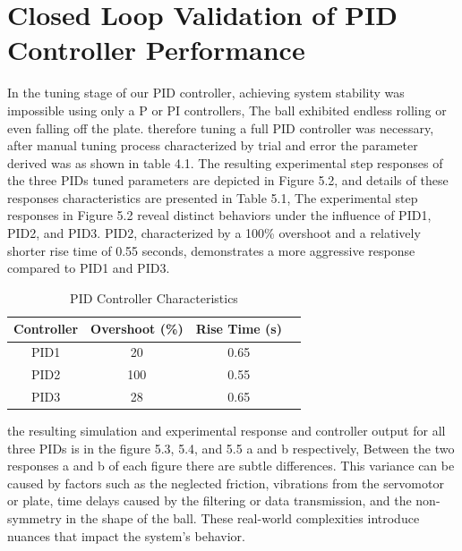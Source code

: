 \section{Closed Loop Validation of PID Controller Performance}
In the tuning stage of our PID controller, achieving system stability was impossible  using only a P or PI controllers, The ball exhibited endless rolling or even falling off the plate.
therefore tuning a full PID controller was necessary, after  manual tuning process characterized by trial and error the parameter derived was  as shown in table 4.1. The resulting  experimental step responses of the three PIDs tuned parameters are depicted in Figure 5.2, and details of these responses characteristics are presented in Table 5.1, The experimental step responses in Figure 5.2 reveal distinct behaviors under the influence of PID1, PID2, and PID3. PID2, characterized by a 100\% overshoot and a relatively shorter rise time of 0.55 seconds, demonstrates a more aggressive response compared to PID1 and PID3.
\begin{table}[ht]
    \centering
    \caption{PID Controller Characteristics}
    \label{tab:pid-parameters}
    \begin{tabular}{|c|c|c|c|}
        \hline
        \textbf{Controller} & \textbf{Overshoot (\%)} & \textbf{Rise Time (s)} \\
        \hline
        PID1 & 20 & 0.65 \\
        PID2 & 100 & 0.55 \\
        PID3 & 28 & 0.65 \\
        \hline
    \end{tabular}
\end{table} 

the resulting simulation and experimental response and controller output for all three PIDs is in the figure 5.3, 5.4, and 5.5 a and b respectively, Between the two responses a and b of each figure there are subtle differences. This variance can be caused by factors such as the neglected friction, vibrations from the servomotor or plate, time delays caused by the filtering or data transmission, and the non-symmetry in the shape of the ball. These real-world complexities introduce nuances that impact the system's behavior.

